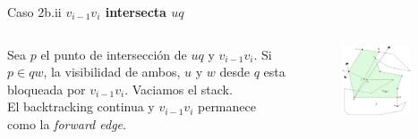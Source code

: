 \documentclass[aspectratio=169,xcolor=dvipsnames, t]{beamer}
\begin{document}
\begin{frame}{Caso 2b.ii}
    \textbf{$v_{i-1}v_{i}$ intersecta $uq$}\\
    \vspace{0.5cm}
    \begin{columns}
    \begin{column}{0.45\textwidth}
        Sea $p$ el punto de intersección de $uq$ y $v_{i-1}v_{i}$. Si $p \in qw$, la visibilidad de ambos, $u$ y $w$ desde $q$ esta bloqueada por $v_{i-1}v_{i}$. Vaciamos el stack.\\
        \vspace{0.5cm}
        El backtracking continua y $v_{i-1}v_{i}$ permanece como la \textit{forward edge}.\\
    \vspace{0.5cm}
    \end{column}
    \begin{column}{0.45\textwidth}  %
    \vspace{-3cm}
        \begin{figure}
            \centering
            \includegraphics[width=0.85\textwidth]{imagenes/Caso2.7a.png}
        \end{figure}
    \end{column}
    \end{columns}
\end{frame}

\end{document}
